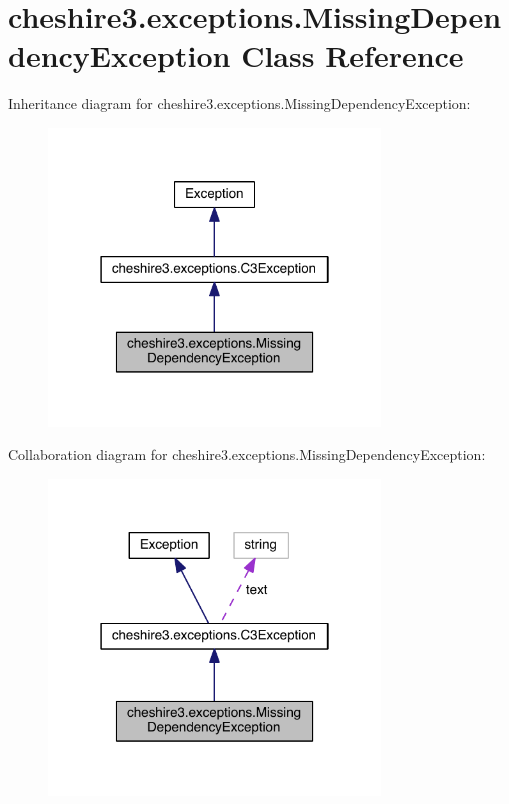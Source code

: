 \hypertarget{classcheshire3_1_1exceptions_1_1_missing_dependency_exception}{\section{cheshire3.\-exceptions.\-Missing\-Dependency\-Exception Class Reference}
\label{classcheshire3_1_1exceptions_1_1_missing_dependency_exception}
}


Inheritance diagram for cheshire3.\-exceptions.\-Missing\-Dependency\-Exception\-:
\nopagebreak
\begin{figure}[H]
\begin{center}
\leavevmode
\includegraphics[width=250pt]{classcheshire3_1_1exceptions_1_1_missing_dependency_exception__inherit__graph}
\end{center}
\end{figure}


Collaboration diagram for cheshire3.\-exceptions.\-Missing\-Dependency\-Exception\-:
\nopagebreak
\begin{figure}[H]
\begin{center}
\leavevmode
\includegraphics[width=250pt]{classcheshire3_1_1exceptions_1_1_missing_dependency_exception__coll__graph}
\end{center}
\end{figure}
